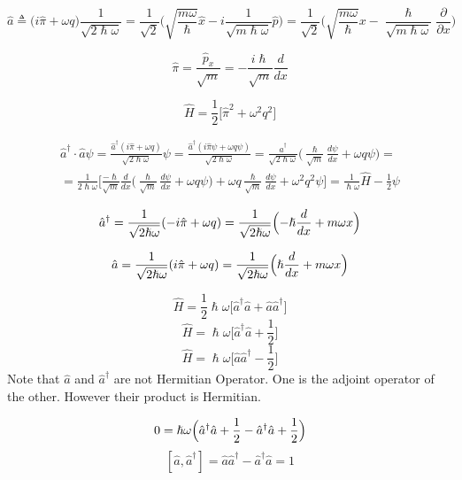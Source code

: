 \documentclass{article}
\begin{document}
$$\hat{a} \triangleq \bigl( i\hat{\pi} + \omega q \bigl) \frac{1}{\sqrt{2\hslash\omega}} =  \frac{1}{\sqrt{2}} \biggl( \sqrt{\frac{m\omega}{\hslash}}\hat{x}- i \frac{1}{\sqrt{m\hslash\omega}} \hat{p} \biggl) = \frac{1}{\sqrt{2}} \biggl( \sqrt{\frac{m\omega}{\hslash}}x-  \frac{\hslash}{\sqrt{m\hslash\omega}}  \frac{\partial }{\partial x}\biggl)$$

$$\hat{\pi} = \frac{\hat{p}_x}{\sqrt{m}} = - \frac{i \hslash}{\sqrt{m}} \frac{d}{dx} $$

$$ \hat{H} = \frac{1}{2} \biggl[ \hat{\pi}^2 + \omega^2 q^2 \biggl]$$

\begin{align*}
\hat{a}^{\dag} \cdot \hat{a} \psi = \frac{\hat{a}^{\dag} (i\hat{\pi} + \omega q)}{\sqrt{2\hslash \omega}} \psi = \frac{\hat{a}^{\dag}(i\hat{\pi}\psi+\omega q \psi)}{\sqrt{2\hslash \omega}} = \frac{\hat{a}^{\dag}}{\sqrt{2\hslash\omega}} \Biggl( \frac{\hslash}{\sqrt{m}} \frac{d\psi}{dx} + \omega q \psi \Biggl) = \\ = \frac{1}{2\hslash \omega} \Biggl[ \frac{-\hslash}{\sqrt{m}} \frac{d}{dx} \Biggl( \frac{\hslash}{\sqrt{m}} \frac{d\psi}{dx} + \omega q \psi \Biggl) + \omega q \frac{\hslash}{\sqrt{m}} \frac{d\psi}{dx} + \omega^2q^2\psi\Biggl] = \frac{1}{\hslash \omega} \hat{H} -\frac{1}{2}\psi
\end{align*}

$$\hat{a}^{\dag} = \frac{1}{\sqrt{2\hslash\omega}} ( -i\hat{\pi}+\omega q) = \frac{1}{\sqrt{2\hslash\omega}} \Bigl( -\hslash\frac{d}{dx}+ m\omega x \Bigl)$$

$$\hat{a} = \frac{1}{\sqrt{2\hslash\omega}} (i\hat{\pi}+\omega q) = \frac{1}{\sqrt{2\hslash\omega}} \Bigl(\hslash\frac{d}{dx}+ m\omega x \Bigl)$$

$$\hat{H} = \frac{1}{2} \hslash \omega \bigl[\hat{a}^{\dag}\hat{a} +\hat{a}\hat{a}^{\dag} \bigl] $$
$$\hat{H} = \hslash \omega \bigl[ \hat{a}^{\dag} \hat{a} + \frac{1}{2}\bigl] $$
$$\hat{H} = \hslash \omega \bigl[\hat{a} \hat{a}^{\dag} - \frac{1}{2}\bigl] $$
Note that $\hat{a}$ and $\hat{a}^{\dag}$ are not Hermitian Operator. One is the adjoint operator of the other. However their product is Hermitian.

$$ 0 = \hslash \omega \Bigl( \hat{a}^{\dag} \hat{a} + \frac{1}{2} - \hat{a}^{\dag}\hat{a} + \frac{1}{2} \Bigl) $$
$$[\hat{a},\hat{a}^{\dag}] = \hat{a}\hat{a}^{\dag} - \hat{a}^{\dag}\hat{a} = 1$$
\end{document}
